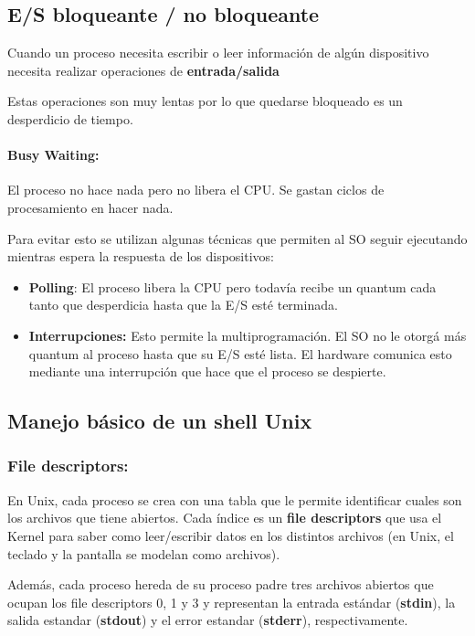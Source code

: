 \subsection{E/S bloqueante / no bloqueante}
	Cuando un proceso necesita escribir o leer información de algún dispositivo necesita realizar operaciones de \textbf{entrada/salida}

	Estas operaciones son muy lentas por lo que quedarse bloqueado es un desperdicio de tiempo.

	\paragraph{Busy Waiting:} El proceso no hace nada pero no libera el CPU. Se gastan ciclos de procesamiento en hacer nada.

	Para evitar esto se utilizan algunas técnicas que permiten al SO seguir ejecutando mientras espera la respuesta de los dispositivos:

	\begin{itemize}
		\item \textbf{Polling}: El proceso libera la CPU pero todavía recibe un quantum cada tanto que desperdicia hasta que la E/S esté terminada.
		\item \textbf{Interrupciones:} Esto permite la multiprogramación. El SO no le otorgá más quantum al proceso hasta que su E/S esté lista. El hardware comunica esto mediante una interrupción que hace que el proceso se despierte.
	\end{itemize}

	\subsection{Manejo básico de un shell Unix}
\subsubsection{File descriptors:}
	En Unix, cada proceso se crea con una tabla que le permite identificar cuales son los archivos que tiene abiertos. Cada índice es un \textbf{file descriptors} que usa el Kernel para saber como leer/escribir datos en los distintos archivos (en Unix, el teclado y la pantalla se modelan como archivos).
	
	Además, cada proceso hereda de su proceso padre tres archivos abiertos que ocupan los file descriptors 0, 1 y 3 y representan la entrada estándar (\textbf{stdin}), la salida estandar (\textbf{stdout}) y el error estandar (\textbf{stderr}), respectivamente.
	

